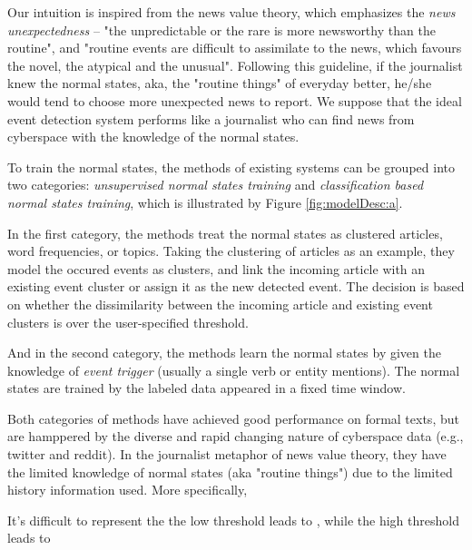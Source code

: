\documentclass{sig-alternate-05-2015}
\begin{document}
Our intuition is inspired from the news value theory\cite{galtung1965structure}\cite{caple2013delving}, which emphasizes the \textit{news unexpectedness} -- "the unpredictable or the rare is more newsworthy than the routine"\cite{bell1991language}, and "routine events are difficult to assimilate to the news, which favours the novel, the atypical and the unusual"\cite{montgomery2007discourse}.
Following this guideline, if the journalist knew the normal states, aka, the "routine things" of everyday better, he/she would tend to choose more unexpected news to report. 
We suppose that the ideal event detection system performs like a journalist who can find news from cyberspace with the knowledge of the normal states. 

To train the normal states, the methods of existing systems can be grouped into two categories: \textit{unsupervised normal states training} and \textit{classification based normal states training}, which is illustrated by Figure \ref{fig:modelDesc:a}.

In the first category, the methods treat the normal states as clustered articles\cite{Petrovic:2010uj}\cite{Wurzer:2015wq}, word frequencies\cite{Mathioudakis:2010fc}\cite{Weng:2011wz}, or topics\cite{Diao:2012wj}\cite{Yan:2015wm}. 
Taking the clustering of articles\cite{Petrovic:2010uj}\cite{Wurzer:2015wq} as an example, they model the occured events as clusters, and link the incoming article with an existing event cluster or assign it as the new detected event.
The decision is based on whether the dissimilarity between the incoming article and existing event clusters is over the user-specified threshold. 

And in the second category, the methods learn the normal states by given the knowledge of \textit{event trigger}\cite{Li2013JointEE}\cite{Nguyen2015EventDA} (usually a single verb or entity mentions). The normal states are trained by the labeled data appeared in a fixed time window.

Both categories of methods have achieved good performance on formal texts, but are hamppered by the diverse and rapid changing nature of cyberspace data (e.g., twitter\cite{Asur:2011tc} and reddit\cite{singer2014evolution}).
In the journalist metaphor of news value theory, they have the limited knowledge of normal states (aka "routine things") due to the limited history information used. 
More specifically, 


It's difficult to represent the 
the low threshold leads to , while the high threshold leads to 
\end{document}

